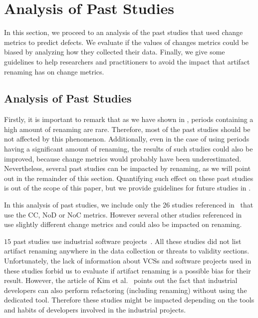 \section{Analysis of Past Studies}
\label{sec:study}

In this section, we proceed to an analysis of the past studies that used change metrics to predict defects. We evaluate if the values of changes metrics could be biased by analyzing how they collected their data. Finally, we give some guidelines to help researchers and practitioners to avoid the impact that artifact renaming has on change metrics.

\subsection{Analysis of Past Studies}

Firstly, it is important to remark that as we have shown in , periods containing a high amount of renaming are rare. Therefore, most of the past studies should be not affected by this phenomenon. Additionally, even in the case of using periods having a significant amount of renaming, the results of such studies could also be improved, because change metrics would probably have been underestimated. Nevertheless, several past studies can be impacted by renaming, as we will point out in the remainder of this section. Quantifying such effect on these past studies is out of the scope of this paper, but we provide guidelines for future studies in .

In this analysis of past studies, we include only the 26 studies referenced in~\cite{radjenovic_software_2013} that use the CC, NoD or NoC metrics. However several other studies referenced in~\cite{radjenovic_software_2013} use slightly different change metrics and could also be impacted on renaming.

$15$ past studies use industrial software projects~\cite{arisholm_systematic_2010,graves_predicting_2000,khoshgoftaar_using_2000,layman_iterative_2008,munson_code_1998,nagappan_use_2005,nagappan_influence_2008,nagappan_using_2007,nagappan_using_2006,nagappan_change_2010,nikora_building_2006,ostrand_programmer-based_2010,weyuker_too_2008,weyuker_using_2007,yuan_application_2000}. All these studies did not list artifact renaming anywhere in the data collection or threats to validity sections. Unfortunately, the lack of information about VCSs and software projects used in these studies forbid us to evaluate if artifact renaming is a possible bias for their result. However, the article of Kim et al.~\cite{kim_field_2012} points out the fact that industrial developers can also perform refactoring (including renaming) without using the dedicated tool. Therefore these studies might be impacted depending on the tools and habits of developers involved in the industrial projects.

